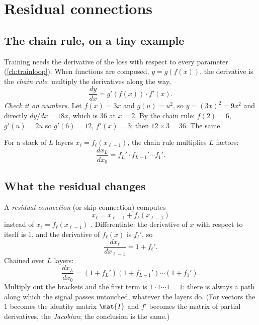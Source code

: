 \section{Residual connections}\label{sec:block:residual}

\subsection{The chain rule, on a tiny example}

Training needs the derivative of the loss with respect to every parameter (\cref{ch:trainloop}).
When functions are composed, $y = g(f(x))$, the derivative is the \emph{chain
rule}: multiply the derivatives along the way,
\begin{equation}\label{eq:block:chain}
  \frac{dy}{dx} = g'(f(x))\cdot f'(x).
\end{equation}
\emph{Check it on numbers.} Let $f(x) = 3x$ and $g(u) = u^2$, so $y = (3x)^2 = 9x^2$ and directly
$dy/dx = 18x$, which is 36 at $x = 2$. By the chain rule: $f(2) = 6$, $g'(u) = 2u$ so
$g'(6) = 12$, $f'(x) = 3$; then $12\times3 = 36$. The same.

For a stack of $L$ layers $x_\ell = f_\ell(x_{\ell-1})$, the chain rule multiplies $L$ factors:
\begin{equation}\label{eq:block:plainchain}
  \frac{d x_L}{d x_0} = f_L'\cdot f_{L-1}'\cdots f_1' .
\end{equation}

\subsection{What the residual changes}

A \emph{residual connection} (or skip connection) computes
\begin{equation}\label{eq:block:res}
  x_\ell = x_{\ell-1} + f_\ell(x_{\ell-1})
\end{equation}
instead of $x_\ell = f_\ell(x_{\ell-1})$ \citep{he2016deep}. Differentiate: the derivative of
$x$ with respect to itself is 1, and the derivative of $f_\ell(x)$ is $f_\ell'$, so
\begin{equation}\label{eq:block:resgrad}
  \frac{d x_\ell}{d x_{\ell-1}} = 1 + f_\ell' .
\end{equation}
Chained over $L$ layers:
\begin{equation}\label{eq:block:reschain}
  \frac{d x_L}{d x_0} = (1 + f_L')(1 + f_{L-1}')\cdots(1 + f_1') .
\end{equation}
Multiply out the brackets and the first term is $1\cdot1\cdots1 = 1$: there is always a path
along which the signal passes untouched, whatever the layers do. (For vectors the 1 becomes the
identity matrix $\mat{I}$ and $f'$ becomes the matrix of partial derivatives, the
\emph{Jacobian}; the conclusion is the same.)

